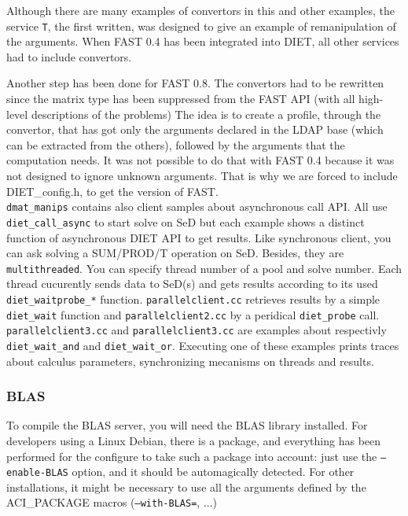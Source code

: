         Although there are many examples of convertors in this and other examples, the
        service \texttt{T}, the first written, was designed to give an example of
        remanipulation of the arguments. When FAST 0.4 has been integrated into DIET,
        all other services had to include convertors.

        Another step has been done for FAST 0.8. The convertors had to be rewritten
        since the matrix type has been suppressed from the FAST API (with all high-level
            descriptions of the problems) The idea is to create a profile, through the
        convertor, that has got only the arguments declared in the LDAP base (which can
            be extracted from the others), followed by the arguments that the computation
        needs. It was not possible to do that with FAST 0.4 because it was not designed
        to ignore unknown arguments. That is why we are forced to include
        \textsf{DIET\_config.h}, to get the version of FAST.
        \\

        \texttt{dmat\_manips} contains also client samples about asynchronous call API. All
        use \texttt{diet\_call\_async} to start solve on SeD but each example shows
        a distinct function of asynchronous DIET API to get results. Like synchronous
        client, you can ask solving a SUM/PROD/T operation on SeD. Besides, they are
        \texttt{multithreaded}. You can specify thread number of a pool and solve number. Each
        thread cucurently sends data to SeD(s) and gets results according to its used
        \texttt{diet\_wait\/probe\_*} function.
        \texttt{parallelclient.cc} retrieves results by a simple \texttt{diet\_wait} function
        and \texttt{parallelclient2.cc} by a peridical \texttt{diet\_probe} call.
        \texttt{parallelclient3.cc} and \texttt{parallelclient3.cc} are examples about
        respectivly \texttt{diet\_wait\_and} and \texttt{diet\_wait\_or}. Executing
        one of these examples prints traces about calculus parameters, synchronizing
        mecanisms on threads and results.

        \subsubsection{BLAS}

        To compile the BLAS server, you will need the BLAS library installed. For
        developers using a Linux Debian, there is a package, and everything has been
        performed for the configure to take such a package into account: just use the
        \texttt{--enable-BLAS} option, and it should be automagically detected. For
  other installations, it might be necessary to use all the arguments defined by
the ACI\_PACKAGE macros (\texttt{--with-BLAS=}, ...)

